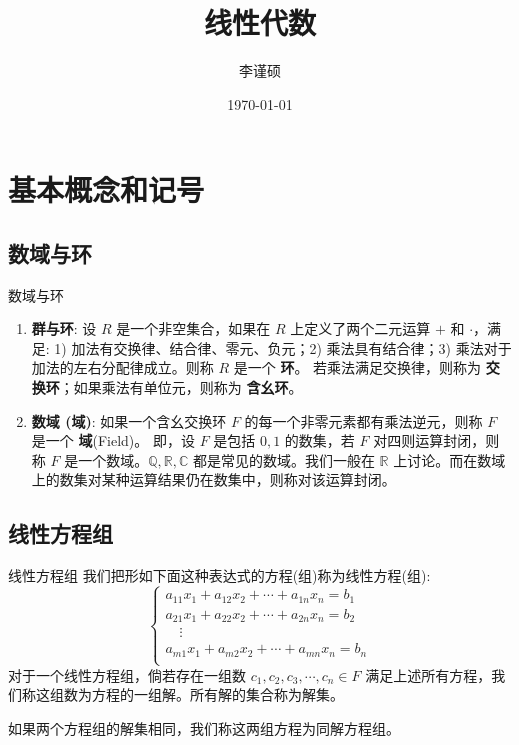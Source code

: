 \documentclass[a4paper,12pt]{ctexart}
\title{\textbf{线性代数}}
\author{李谨硕}
\date{\today}
\begin{document}
\maketitle
\tableofcontents
\newpage

\section{基本概念和记号}

\subsection{数域与环}
\begin{mydef}{数域与环}{}
\begin{enumerate}
    \item \textbf{群与环}: 设 $R$ 是一个非空集合，如果在 $R$ 上定义了两个二元运算 $+$ 和 $\cdot$，满足:
    1) 加法有交换律、结合律、零元、负元；2) 乘法具有结合律；3) 乘法对于加法的左右分配律成立。则称 $R$ 是一个 \textbf{环}。
    若乘法满足交换律，则称为 \textbf{交换环}；如果乘法有单位元，则称为 \textbf{含幺环}。
    \item \textbf{数域 (域)}: 如果一个含幺交换环 $F$ 的每一个非零元素都有乘法逆元，则称 $F$ 是一个 \textbf{域}(Field)。
    即，设 $F$ 是包括 $0, 1$ 的数集，若 $F$ 对四则运算封闭，则称 $F$ 是一个数域。$\mathbb{Q, R, C}$ 都是常见的数域。我们一般在 $\mathbb{R}$ 上讨论。而在数域上的数集对某种运算结果仍在数集中，则称对该运算封闭。
\end{enumerate}
\end{mydef}

\subsection{线性方程组}
\begin{mydef}{线性方程组}{}
我们把形如下面这种表达式的方程(组)称为线性方程(组):
\[
\begin{cases}
a_{11}x_1 + a_{12}x_2 + \cdots + a_{1n}x_n = b_1\\
a_{21}x_1 + a_{22}x_2 + \cdots + a_{2n}x_n = b_2\\
\quad \vdots \\
a_{m1}x_1 + a_{m2}x_2 + \cdots + a_{mn}x_n = b_n\\
\end{cases}
\]
对于一个线性方程组，倘若存在一组数 $c_1, c_2, c_3, \cdots , c_n \in F$ 满足上述所有方程，我们称这组数为方程的一组解。所有解的集合称为解集。

如果两个方程组的解集相同，我们称这两组方程为同解方程组。
\end{mydef}
\end{document}
